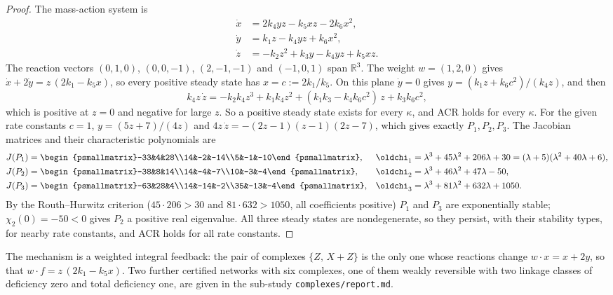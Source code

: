 \documentclass[11pt,a4paper]{report}
\providecommand{\R}{\mathbb{R}}
\begin{document}
\begin{proof}
The mass-action system is
\begin{align*}
\dot x&=2k_4yz-k_5xz-2k_6x^2,\\
\dot y&=k_1z-k_4yz+k_6x^2,\\
\dot z&=-k_2z^2+k_3y-k_4yz+k_5xz .
\end{align*}
The reaction vectors $(0,1,0)$, $(0,0,-1)$, $(2,-1,-1)$ and $(-1,0,1)$ span $\R^3$. The weight $w=(1,2,0)$ gives
$\dot x+2\dot y=z\,(2k_1-k_5x)$, so every positive steady state has $x=c:=2k_1/k_5$. On this plane $\dot y=0$ gives
$y=(k_1z+k_6c^2)/(k_4z)$, and then
\[
k_4z\,\dot z=-k_2k_4z^3+k_1k_4z^2+(k_1k_3-k_4k_6c^2)\,z+k_3k_6c^2 ,
\]
which is positive at $z=0$ and negative for large $z$. So a positive steady state exists for every $\kappa$, and ACR
holds for every $\kappa$. For the given rate constants $c=1$, $y=(5z+7)/(4z)$ and
$4z\,\dot z=-(2z-1)(z-1)(2z-7)$, which gives exactly $P_1,P_2,P_3$. The Jacobian matrices and their characteristic
polynomials are
\begin{align*}
J(P_1)&=\begin{psmallmatrix}-33&4&28\\14&-2&-14\\5&-1&-10\end{psmallmatrix}, &
\chi_1&=\lambda^3+45\lambda^2+206\lambda+30=(\lambda+5)(\lambda^2+40\lambda+6),\\
J(P_2)&=\begin{psmallmatrix}-38&8&14\\14&-4&-7\\10&-3&-4\end{psmallmatrix}, &
\chi_2&=\lambda^3+46\lambda^2+47\lambda-50,\\
J(P_3)&=\begin{psmallmatrix}-63&28&4\\14&-14&-2\\35&-13&-4\end{psmallmatrix}, &
\chi_3&=\lambda^3+81\lambda^2+632\lambda+1050 .
\end{align*}
By the Routh--Hurwitz criterion ($45\cdot206>30$ and $81\cdot632>1050$, all coefficients positive) $P_1$ and $P_3$
are exponentially stable; $\chi_2(0)=-50<0$ gives $P_2$ a positive real eigenvalue. All three steady states are
nondegenerate, so they persist, with their stability types, for nearby rate constants, and ACR holds for all rate
constants.
\end{proof}

The mechanism is a weighted integral feedback: the pair of complexes $\{Z,\,X+Z\}$ is the only one whose reactions
change $w\cdot x=x+2y$, so that $w\cdot f=z\,(2k_1-k_5x)$. Two further certified networks with six complexes, one of
them weakly reversible with two linkage classes of deficiency zero and total deficiency one, are given in the
sub-study \texttt{complexes/report.md}.
\end{document}
